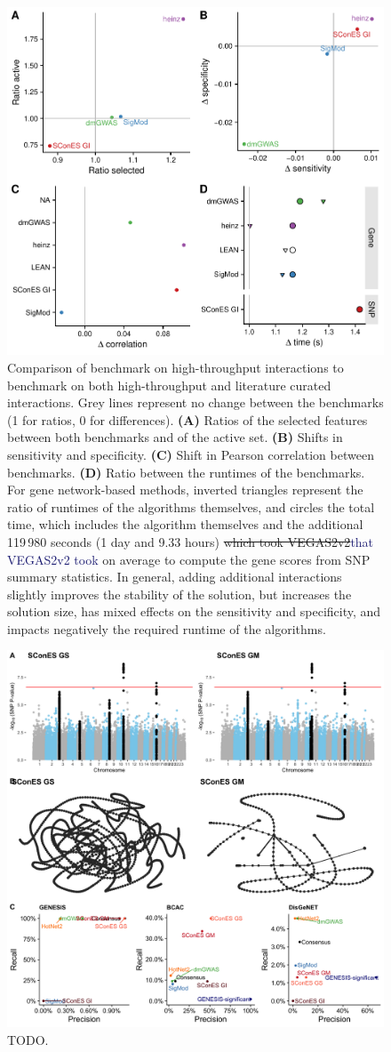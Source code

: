 \documentclass[twocolumn, 11pt]{article}
\newcommand{\caz}[2]{{\sout{#1}}\unskip\space\textcolor{MidnightBlue}{#2}}
\begin{document}
\begin{figure}[htbp]
\centering
\includegraphics[width=.85\linewidth]{./figures/sfigure_7.pdf}
\caption{\label{sfig:lc_ht_comparison}
Comparison of benchmark on high-throughput interactions to benchmark on both high-throughput and literature curated interactions. Grey lines represent no change between the benchmarks (1 for ratios, 0 for differences). \textbf{(A)} Ratios of the selected features between both benchmarks and of the active set. \textbf{(B)} Shifts in sensitivity and specificity. \textbf{(C)} Shift in Pearson correlation between benchmarks. \textbf{(D)} Ratio between the runtimes of the benchmarks. For gene network-based methods, inverted triangles represent the ratio of runtimes of the algorithms themselves, and circles the total time, which includes the algorithm themselves and the additional 119\,980 seconds (1 day and 9.33 hours) \caz{which took VEGAS2v2}{that VEGAS2v2 took} on average to compute the gene scores from SNP summary statistics. In general, adding additional interactions slightly improves the stability of the solution, but increases the solution size, has mixed effects on the sensitivity and specificity, and impacts negatively the required runtime of the algorithms.}
\end{figure}

\begin{figure}[htbp]
  \centering
  \includegraphics[width=.9\linewidth]{./figures/sfigure_8.png}
  \caption{\label{sfig:scones_gsm} TODO.}
\end{figure}
\end{document}
